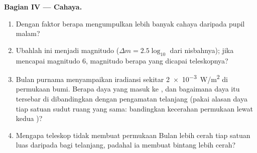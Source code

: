 \begin{problem}
\medskip
\noindent\textbf{Bagian IV --- Cahaya.}
\begin{enumerate}[resume]
  \item Dengan faktor berapa  mengumpulkan lebih banyak
        cahaya daripada pupil malam?
  \item Ubahlah ini menjadi magnitudo ($\Delta m = 2.5\log_{10}$ dari
        nisbahnya); jika  mencapai magnitudo $6$, magnitudo berapa
        yang dicapai teleskopnya?
  \item Bulan purnama menyampaikan iradiansi sekitar
        \qty{2e-3}{W/m^2} di permukaan bumi. Berapa daya yang masuk ke
        , dan bagaimana daya itu tersebar di 
        dibandingkan dengan pengamatan  telanjang (pakai alasan daya
        tiap satuan sudut ruang yang sama: bandingkan kecerahan
        permukaan lewat kedua )?
  \item Mengapa teleskop tidak membuat permukaan Bulan lebih cerah tiap
        satuan luas daripada bagi  telanjang, padahal ia membuat
        bintang lebih cerah?
\end{enumerate}


\end{problem}
